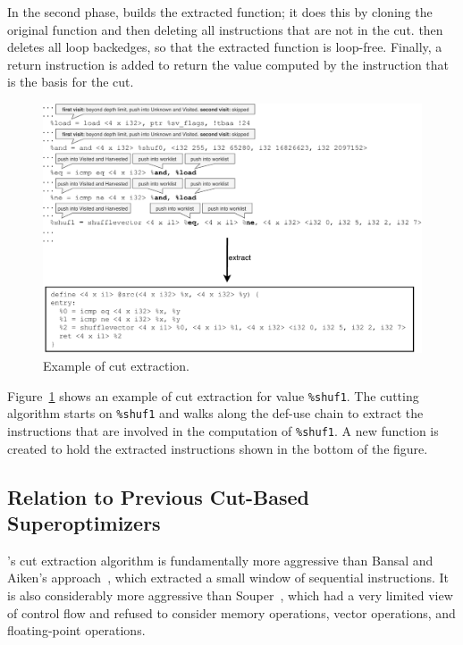 In the second phase, \minotaur{} builds the extracted function; it does
this by cloning the original function and then deleting all
instructions that are not in the cut.
%
\minotaur{} then deletes all loop backedges, so that the extracted
function is loop-free.
%
Finally, a return instruction is added to return the value computed by
the instruction that is the basis for the cut.

\begin{figure}[tbp]
  \centering
  \includegraphics[width=0.95\linewidth]{figures/slice.pdf}
  \caption{Example of cut extraction.}
  \label{fig:cut}
\end{figure}


Figure~\ref{fig:cut} shows an example of cut extraction
for value \texttt{\%shuf1}.
%
The cutting algorithm starts on \texttt{\%shuf1} and walks along the
def-use chain to extract the instructions that are involved in the
computation of \texttt{\%shuf1}.
%
A new function is created to hold the extracted instructions shown
in the bottom of the figure.



\subsection{Relation to Previous Cut-Based Superoptimizers}

\minotaur's cut extraction algorithm is fundamentally more aggressive
than Bansal and Aiken's approach~\cite{Bansal06}, which extracted a
small window of sequential instructions.
%
It is also considerably more aggressive than Souper~\cite{souper},
which had a very limited view of control flow and refused to consider
memory operations, vector operations, and floating-point operations.